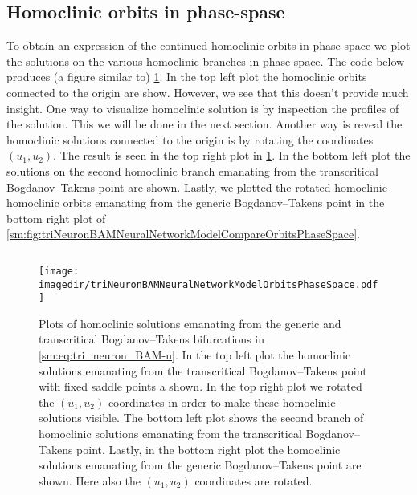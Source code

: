 \subsection{Homoclinic orbits in phase-spase}
To obtain an expression of the continued homoclinic orbits in phase-space
we plot the solutions on the various homoclinic branches in phase-space.
The code below produces (a figure similar to)
\cref{sm:fig:triNeuronBAMNeuralNetworkModelOrbitsPhaseSpace}.
In the top left plot the homoclinic orbits connected to the origin are show. However,
we see that this doesn't provide much insight. 
One way to visualize homoclinic solution is by inspection the
profiles of the solution. This we will be done in the next section.
Another way is reveal the homoclinic solutions connected to the origin is by
rotating the coordinates $(u_1,u_2)$. The result is seen in the top right
plot in \cref{sm:fig:triNeuronBAMNeuralNetworkModelOrbitsPhaseSpace}.
In the bottom left plot the solutions on the second homoclinic branch emanating
from the transcritical Bogdanov--Takens point are shown. Lastly, we plotted the
rotated homoclinic homoclinic orbits emanating from the generic
Bogdanov--Takens point in the bottom right plot of
\cref{sm:fig:triNeuronBAMNeuralNetworkModelCompareOrbitsPhaseSpace}.
\inputminted[firstline=269, lastline=335]{MATLAB}{\pathToDDEBifToolDemos/BAM_neural_network_model/BAMnn.m}
\begin{figure}[ht]
    \texttt{[image: \\imagedir/triNeuronBAMNeuralNetworkModelOrbitsPhaseSpace.pdf]}
    \caption{
    Plots of homoclinic solutions emanating from the generic and transcritical
    Bogdanov--Takens bifurcations in \cref{sm:eq:tri_neuron_BAM-u}. In the top
    left plot the homoclinic solutions emanating from the transcritical
    Bogdanov--Takens point with fixed saddle points a shown. In the top right
    plot we rotated the $(u_1, u_2)$ coordinates in order to make these
    homoclinic solutions visible. The bottom left plot shows the second branch
    of homoclinic solutions emanating from the transcritical Bogdanov--Takens
    point. Lastly, in the bottom right plot the homoclinic solutions emanating
    from the generic Bogdanov--Takens point are shown. Here also the $(u_1,
    u_2)$ coordinates are rotated.
    }
    \label{sm:fig:triNeuronBAMNeuralNetworkModelOrbitsPhaseSpace}
\end{figure}


